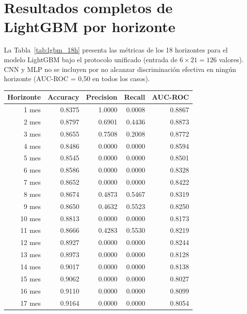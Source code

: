 \section{Resultados completos de LightGBM por horizonte}

La Tabla~\ref{tab:lgbm_18h} presenta las métricas de los 18 horizontes para el modelo LightGBM bajo el protocolo unificado (entrada de $6 \times 21 = 126$ valores). CNN y MLP no se incluyen por no alcanzar discriminación efectiva en ningún horizonte (AUC-ROC = 0,50 en todos los casos).

\begin{table}[h!]
    \centering
    \small
    \begin{tabular}{|r|r|r|r|r|}
    \hline
    \textbf{Horizonte} & \textbf{Accuracy} & \textbf{Precision} & \textbf{Recall} & \textbf{AUC-ROC} \\
    \hline
        1 mes & 0.8375 & 1.0000 & 0.0008 & 0.8867 \\
    \hline
        2 mes & 0.8797 & 0.6901 & 0.4436 & 0.8873 \\
    \hline
        3 mes & 0.8655 & 0.7508 & 0.2008 & 0.8772 \\
    \hline
        4 mes & 0.8486 & 0.0000 & 0.0000 & 0.8594 \\
    \hline
        5 mes & 0.8545 & 0.0000 & 0.0000 & 0.8501 \\
    \hline
        6 mes & 0.8586 & 0.0000 & 0.0000 & 0.8328 \\
    \hline
        7 mes & 0.8652 & 0.0000 & 0.0000 & 0.8422 \\
    \hline
        8 mes & 0.8674 & 0.4873 & 0.5467 & 0.8319 \\
    \hline
        9 mes & 0.8650 & 0.4632 & 0.5523 & 0.8250 \\
    \hline
        10 mes & 0.8813 & 0.0000 & 0.0000 & 0.8173 \\
    \hline
        11 mes & 0.8666 & 0.4283 & 0.5530 & 0.8219 \\
    \hline
        12 mes & 0.8927 & 0.0000 & 0.0000 & 0.8244 \\
    \hline
        13 mes & 0.8973 & 0.0000 & 0.0000 & 0.8128 \\
    \hline
        14 mes & 0.9017 & 0.0000 & 0.0000 & 0.8138 \\
    \hline
        15 mes & 0.9062 & 0.0000 & 0.0000 & 0.8027 \\
    \hline
        16 mes & 0.9110 & 0.0000 & 0.0000 & 0.8099 \\
    \hline
        17 mes & 0.9164 & 0.0000 & 0.0000 & 0.8054 \\

\end{tabular}
\end{table}
